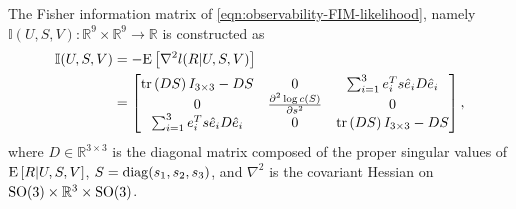 \begin{lemma} \label{lemma:observability-FIM}
	The Fisher information matrix of \eqref{eqn:observability-FIM-likelihood}, namely $\mathbb{I}(U,S,V):\mathbb{R}^9\times\mathbb{R}^9\rightarrow \mathbb{R}$ is constructed as 
	\begin{align} \label{eqn:observability-FIM}
		\mathbb{I} (U,S,V) &= -\mathrm{E}\left[  \nabla^2 l (R|U,S,V)  \right]\nonumber \\
		&=\begin{bmatrix}
			\mathrm{tr}\left( DS \right)I_{3\times 3}- DS  & 0 & \sum_{i=1}^3 e_i^T s \hat e_i D\hat e_i \\
			0 & \frac{\partial^2 \log c(S)}{\partial s^2} & 0 \\
			\sum_{i=1}^3 e_i^T s \hat e_i D\hat e_i& 0 & \mathrm{tr}\left( DS \right)I_{3\times 3} -DS
		\end{bmatrix},
	\end{align}
	where $D\in\mathbb{R}^{3\times 3}$ is the diagonal matrix composed of the proper singular values of $\mathrm{E}\left[ R|U,S,V \right]$, $S = \mathrm{diag}(s_1, s_2, s_3)$, and $\nabla^2$ is the covariant Hessian on $\mathrm{SO}(3)\times\mathbb{R}^3\times\mathrm{SO}(3)$.
\end{lemma}
